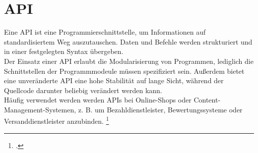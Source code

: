 \section{\acl{API}}
Eine \acs{API} ist eine Programmierschnittstelle, um Informationen auf standardisiertem Weg auszutauschen. Daten und Befehle werden strukturiert und in einer festgelegten Syntax übergeben.\\
Der Einsatz einer \acs{API} erlaubt die Modularisierung von Programmen, lediglich die Schnittstellen der Programmmodeule müssen spezifiziert sein. Außerdem bietet eine unveränderte \acs{API} eine hohe Stabilität auf lange Sicht, während der Quellcode darunter beliebig verändert werden kann.\\
Häufig verwendet werden werden APIs bei Online-Shops oder Content-Management-Systemen, z. B. um Bezahldienstleister, Bewertungssysteme oder Versanddienstleister anzubinden.
\footcite[Vgl.][o. \pno]{Luber_2017_API}

